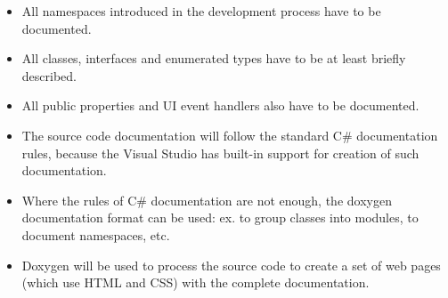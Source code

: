 \documentclass{article}
\begin{document}
\begin{itemize}

  \item All namespaces introduced in the development process have to be documented. 

  \item All classes, interfaces and enumerated types have to be at least briefly described. 

  \item All public properties and UI event handlers also have to be documented.

  \item The source code documentation will follow the standard C\# documentation rules, because the
  Visual Studio has built-in support for creation of such documentation.

  \item Where the rules of C\# documentation are not enough, the doxygen documentation format can be
  used: ex. to group classes into modules, to document namespaces, etc.

  \item Doxygen will be used to process the source code to create a set of web pages (which use HTML
  and CSS) with the complete documentation.

\end{itemize}

% 
% 
% 
% 
% 
% 
% 
% 
% 

\end{document}
